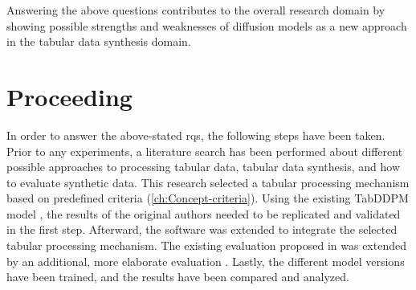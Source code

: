 Answering the above questions contributes to the overall research domain by showing possible strengths and weaknesses of diffusion models
as a new approach in the tabular data synthesis domain.

\section{Proceeding}
\label{ch:intro-proceeding}
In order to answer the above-stated \glspl{rq}, the following steps have been taken.
Prior to any experiments, a literature search has been performed about different possible approaches to processing tabular data, tabular data synthesis, and how to evaluate synthetic data.
This research selected a tabular processing mechanism based on predefined criteria (\autoref{ch:Concept-criteria}).
Using the existing TabDDPM model \cite{kotelnikov2022TabDDPMModellingTabular}, the results of the original authors needed to be replicated and validated in the first step.
Afterward, the software was extended to integrate the selected tabular processing mechanism.
The existing evaluation proposed in \cite{kotelnikov2022TabDDPMModellingTabular} was extended by an additional, more elaborate evaluation \cite{akim2023TabDDPMModellingTabular}.
Lastly, the different model versions have been trained, and the results have been compared and analyzed.

